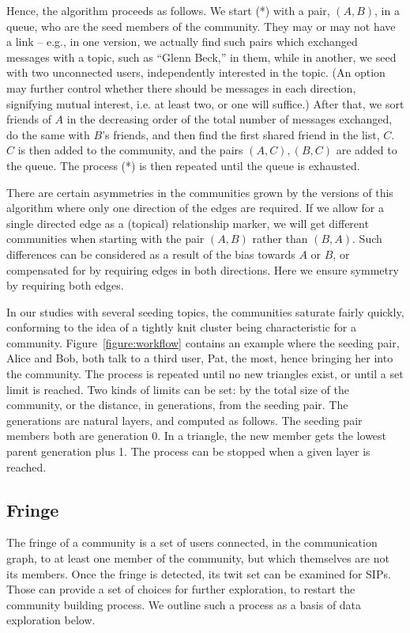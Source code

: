 Hence, the algorithm proceeds as follows.  We start (*) with a pair, $(A,B)$, in a queue, who are the seed members of the community.  They may or may not have a link -- e.g., in one version, we actually find such pairs which exchanged messages with a topic, such as ``Glenn Beck,'' in them, while in another, we seed with two unconnected users, independently interested in the topic.  (An option may further control whether there should be messages in each direction, signifying mutual interest, i.e. at least two, or one will suffice.)  After that, we sort friends of $A$ in the decreasing order of the total number of messages exchanged, do the same with $B$'s friends, and then find the first shared friend in the list, $C$.  $C$ is then added to the community, and the pairs $(A,C), (B,C)$ are added to the queue.  The process (*) is then repeated until the queue is exhausted.

There are certain asymmetries in the communities grown by the versions of this algorithm where only one direction of the edges are required.  If we allow for a single directed edge as a (topical) relationship marker, we will get different communities when starting with the pair $(A,B)$ rather than $(B,A)$.  Such differences can be considered as a result of the bias towards $A$ or $B$, or compensated for by requiring edges in both directions.  Here we ensure symmetry by requiring both edges.

In our studies with several seeding topics, the communities saturate fairly quickly, conforming to the idea of a tightly knit cluster \cite{DBLP:conf/waw/MishraSST07} being characteristic for a community.  Figure~\ref{figure:workflow} contains an example where the seeding pair, Alice and Bob, both talk to a third user, Pat, the most, hence bringing her into the community.  The process is repeated until no new triangles exist, or until a set limit is reached.  Two kinds of limits can be set: by the total size of the community, or the distance, in generations, from the seeding pair.  The generations are natural layers, and computed as follows.  The seeding pair members both are generation 0.  In a triangle, the new member gets the lowest parent generation plus 1.  The process can be stopped when a given layer is reached.

\subsection{Fringe}

The fringe of a community is a set of users connected, in the communication graph, to at least one member of the community, but which themselves are not its members.  Once the fringe is detected, its twit set can be examined for SIPs.  Those can provide a set of choices for further exploration, to restart the community building process.  We outline such a process as a basis of data exploration below.

